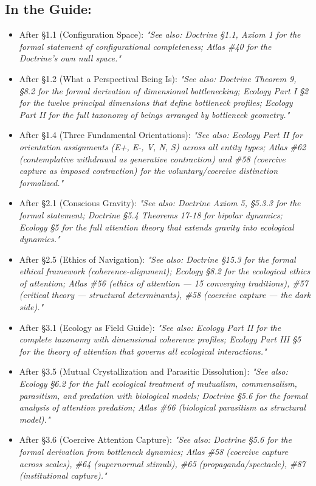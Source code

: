 \subsection*{In the Guide:}


\begin{itemize}[nosep,leftmargin=*]
  \item After §1.1 (Configuration Space): \textit{"See also: Doctrine §1.1, Axiom 1 for the formal statement of configurational completeness; Atlas \#40 for the Doctrine's own null space."}
  \item After §1.2 (What a Perspectival Being Is): \textit{"See also: Doctrine Theorem 9, §8.2 for the formal derivation of dimensional bottlenecking; Ecology Part I §2 for the twelve principal dimensions that define bottleneck profiles; Ecology Part II for the full taxonomy of beings arranged by bottleneck geometry."}
  \item After §1.4 (Three Fundamental Orientations): \textit{"See also: Ecology Part II for orientation assignments (E+, E-, V, N, S) across all entity types; Atlas \#62 (contemplative withdrawal as generative contraction) and \#58 (coercive capture as imposed contraction) for the voluntary/coercive distinction formalized."}
  \item After §2.1 (Conscious Gravity): \textit{"See also: Doctrine Axiom 5, §5.3.3 for the formal statement; Doctrine §5.4 Theorems 17-18 for bipolar dynamics; Ecology §5 for the full attention theory that extends gravity into ecological dynamics."}
  \item After §2.5 (Ethics of Navigation): \textit{"See also: Doctrine §15.3 for the formal ethical framework (coherence-alignment); Ecology §8.2 for the ecological ethics of attention; Atlas \#56 (ethics of attention — 15 converging traditions), \#57 (critical theory — structural determinants), \#58 (coercive capture — the dark side)."}
  \item After §3.1 (Ecology as Field Guide): \textit{"See also: Ecology Part II for the complete taxonomy with dimensional coherence profiles; Ecology Part III §5 for the theory of attention that governs all ecological interactions."}
  \item After §3.5 (Mutual Crystallization and Parasitic Dissolution): \textit{"See also: Ecology §6.2 for the full ecological treatment of mutualism, commensalism, parasitism, and predation with biological models; Doctrine §5.6 for the formal analysis of attention predation; Atlas \#66 (biological parasitism as structural model)."}
  \item After §3.6 (Coercive Attention Capture): \textit{"See also: Doctrine §5.6 for the formal derivation from bottleneck dynamics; Atlas \#58 (coercive capture across scales), \#64 (supernormal stimuli), \#65 (propaganda/spectacle), \#87 (institutional capture)."}

\end{itemize}
